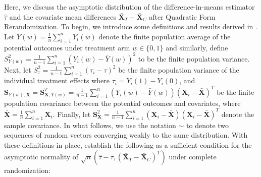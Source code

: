 \documentclass[11pt,twoside]{article}
\theoremstyle{definition}
\theoremstyle{remark}
\begin{document}
Here, we discuss the asymptotic distribution of the difference-in-means estimator $\widehat{\tau}$ and the covariate mean differences $\bar{\mathbf{X}}_T - \bar{\mathbf{X}}_C$ after Quadratic Form Rerandomization. To begin, we introduce some definitions and results derived in \cite{li2018asymptotic}. Let $\bar{Y}(w) = \frac{1}{n} \sum^n_{i=1} Y_i(w)$ denote the finite population average of the potential outcomes under treatment arm $w \in \{0, 1\}$ and similarly, define $S^2_{Y(w)} = \frac{1}{n-1} \sum^n_{i=1} (Y_i(w) - \bar{Y}(w))^2$ to be the finite population variance. Next, let $S^2_\tau = \frac{1}{n-1} \sum^n_{i=1}(\tau_i - \tau)^2$ be the finite population variance of the individual treatment effects where $\tau_i = Y_i(1) - Y_i(0)$, and $\mathbf{S}_{Y(w), \mathbf{X}} = \mathbf{S}^T_{\mathbf{X}, Y(w)} = \frac{1}{n-1} \sum^n_{i=1} (Y_i(w) - \bar{Y}(w))(\mathbf{X}_i - \bar{\mathbf{X}})^T$ be the finite population covariance between the potential outcomes and covariates, where $\bar{\mathbf{X}} = \frac{1}{n}\sum^n_{i=1} \mathbf{X}_i$. Finally, let $\mathbf{S}^2_{\mathbf{X}} = \frac{1}{n-1} \sum^n_{i=1} (\mathbf{X}_i - \bar{\mathbf{X}})(\mathbf{X}_i - \bar{\mathbf{X}})^T$ denote the sample covariance. In what follows, we use the notation $\sim$ to denote two sequences of random vectors converging weakly to the same distribution. With these definitions in place, \cite{li2018asymptotic} establish the following as a sufficient condition for the asymptotic normality of $ \sqrt{n}( \widehat{\tau} - \tau, (\bar{\mathbf{X}}_T - \bar{\mathbf{X}}_C)^T)$ under complete randomization: 
\end{document}
